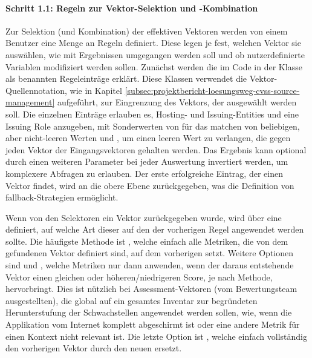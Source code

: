 \paragraph{Schritt 1.1: Regeln zur Vektor-Selektion und -Kombination} \label{par:projektbericht-loesungsweg-cvss-selection-rules-1-1}

Zur Selektion (und Kombination) der effektiven Vektoren werden von einem Benutzer eine Menge an Regeln definiert.
Diese legen je fest, welchen Vektor sie auswählen, wie mit Ergebnissen umgegangen werden soll und ob nutzerdefinierte Variablen modifiziert werden sollen.
Zunächst werden die im Code in der Klasse  als  benannten Regeleinträge erklärt.
Diese Klassen verwendet die Vektor-Quellennotation, wie in Kapitel \ref{subsec:projektbericht-loesungsweg-cvss-source-management} aufgeführt, zur Eingrenzung des Vektors, der ausgewählt werden soll.
Die einzelnen Einträge erlauben es, Hosting- und Issuing-Entities und eine Issuing Role anzugeben, mit Sonderwerten von \qt{*} für das matchen von beliebigen, aber nicht-leeren Werten und , um einen leeren Wert zu verlangen, die gegen jeden Vektor der Eingangsvektoren gehalten werden.
Das Ergebnis kann optional durch einen weiteren Parameter bei jeder Auswertung invertiert werden, um komplexere Abfragen zu erlauben.
Der erste erfolgreiche Eintrag, der einen Vektor findet, wird an die obere Ebene zurückgegeben, was die Definition von fallback-Strategien ermöglicht.


Wenn von den Selektoren ein Vektor zurückgegeben wurde, wird über eine  definiert, auf welche Art dieser auf den der vorherigen Regel angewendet werden sollte.
Die häufigste Methode ist , welche einfach alle Metriken, die von dem gefundenen Vektor definiert sind, auf dem vorherigen setzt.
Weitere Optionen sind  und , welche Metriken nur dann anwenden, wenn der daraus entstehende Vektor einen gleichen oder höheren/niedrigeren Score, je nach Methode, hervorbringt.
Dies ist nützlich bei Assessment-Vektoren (vom Bewertungsteam ausgestellten), die global auf ein gesamtes Inventar zur begründeten Herunterstufung der Schwachstellen angewendet werden sollen, wie, wenn die Applikation vom Internet komplett abgeschirmt ist oder eine andere Metrik für einen Kontext nicht relevant ist.
Die letzte Option ist , welche einfach vollständig den vorherigen Vektor durch den neuen ersetzt.


